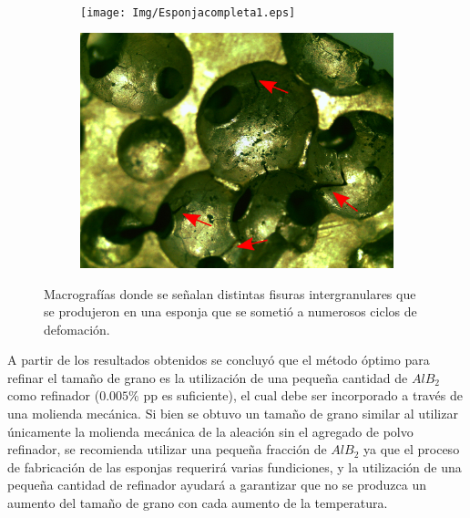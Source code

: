 \documentclass[a4paper,12pt,fleqn,twoside,openany]{book}
\begin{document}
    \begin{figure}%
    \centering
    
    ~ %
     \begin{subfigure}{0.35\textwidth}
        \texttt{[image: Img/Esponjacompleta1.eps]}
        \caption{}
        \label{fig:EsponjaCompleta1}
    \end{subfigure}
 \begin{subfigure}{0.45\textwidth}
        \includegraphics[width=\textwidth]{Img/Fisuras.eps}
        \caption{}
        \label{fig:Ciclos}
    \end{subfigure}
    \caption{Macrografías donde se señalan distintas fisuras intergranulares que se produjeron en una esponja que se sometió a numerosos ciclos de defomación.}
    \label{fig:Fisuras}
    \end{figure}
 

A partir de los resultados obtenidos se concluyó que el método óptimo para refinar el tamaño de grano es la utilización de una pequeña cantidad de $AlB_2$ como refinador ($0.005 \%$ pp es suficiente), el cual debe ser incorporado a través de una molienda mecánica. Si bien se obtuvo un tamaño de grano similar al utilizar únicamente la molienda mecánica de la aleación sin el agregado de polvo refinador, se recomienda utilizar una pequeña fracción de $AlB_2$ ya que el proceso de fabricación de las esponjas requerirá varias fundiciones, y la utilización de una pequeña cantidad de refinador ayudará a garantizar que no se produzca un aumento del tamaño de grano con cada aumento de la temperatura.
\end{document}
